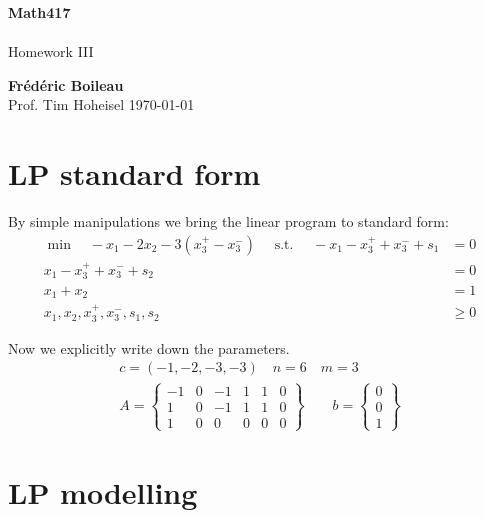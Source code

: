 \documentclass{article}
\begin{document}
	\begin{titlepage}
		\begin{center}
			\vspace*{1cm}
			\textbf{Math417}\\
			\\
			\vspace{0.5cm}
			Homework III
			
			\vspace{1.5cm}
			
			\textbf{Frédéric Boileau}\\
			\vspace{2cm}
			Prof. 
			Tim Hoheisel
			\vfill
			\today
			\thispagestyle{empty}
		\end{center}
	\end{titlepage}
	
	\clearpage

	
	
	\section{LP standard form}
	
	By simple manipulations we bring the linear program to standard form:\\
	\begin{align*}
		\min \quad -x_1 - 2x_2  - 3(x_3^+ - x_3^-) \quad \text{ s.t. } \quad  -x_1 -x_3^+ + x_3^- +s_1 &= 0\\
		x_1 - x_3^+  + x_3^- + s_2 &= 0\\
		x_1+x_2 &= 1\\
		x_1,x_2,x_3^+,x_3^-,s_1,s_2 &\ge 0  
	\end{align*}
	
	Now we explicitly write down the parameters.
	\begin{align}
		c = (-1,-2,-3,-3) \quad n = 6 \quad m=3 \\[3ex]
		A = \begin{Bmatrix*}
		-1 & 0 & -1 & 1 & 1 & 0\\
		 1 & 0 & -1 & 1 & 1 & 0\\
		 1 & 0 &  0 & 0 & 0 & 0   
		\end{Bmatrix*}
		\qquad b = \begin{Bmatrix}
		0\\
		0\\
		1
		\end{Bmatrix}
	\end{align}
	\clearpage
  \section{LP modelling}
  
\end{document}
